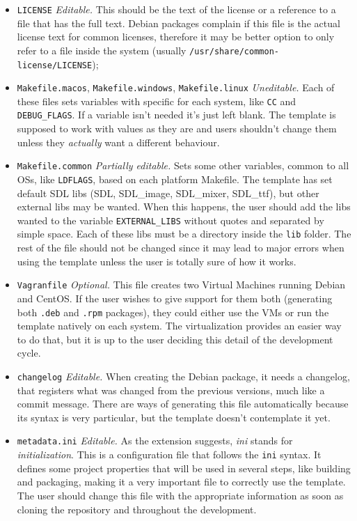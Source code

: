 \begin{itemize}
	\item \texttt{LICENSE} \emph{Editable.} This should be the text of the license or a reference to a file that has the full text. Debian packages complain if this file is the actual license text for common licenses, therefore it may be better option to only refer to a file inside the system (usually \texttt{/usr/share/common-license/LICENSE});
	\item \texttt{Makefile.macos}, \texttt{Makefile.windows}, \texttt{Makefile.linux} \emph{Uneditable.} Each of these files sets variables with specific for each system, like \texttt{CC} and \texttt{DEBUG\_FLAGS}. If a variable isn't needed it's just left blank. The template is supposed to work with values as they are and users shouldn't change them unless they \emph{actually} want a different behaviour.
	\item \texttt{Makefile.common} \emph{Partially editable.} Sets some other variables, common to all OSs, like \texttt{LDFLAGS}, based on each platform Makefile. The template has set default SDL libs (SDL, SDL\_image, SDL\_mixer, SDL\_ttf), but other external libs may be wanted. When this happens, the user should add the libs wanted to the variable \texttt{EXTERNAL\_LIBS} without quotes and separated by simple space. Each of these libs must be a directory inside the \texttt{lib} folder. The rest of the file should not be changed since it may lead to major errors when using the template unless the user is totally sure of how it works.
	\item \texttt{Vagranfile} \emph{Optional.} This file creates two Virtual Machines running Debian and CentOS. If the user wishes to give support for them both (generating both \texttt{.deb} and \texttt{.rpm} packages), they could either use the VMs or run the template natively on each system. The virtualization provides an easier way to do that, but it is up to the user deciding this detail of the development cycle.
	\item \texttt{changelog} \emph{Editable.} When creating the Debian package, it needs a changelog, that registers what was changed from the previous versions, much like a commit message. There are ways of generating this file automatically because its syntax is very particular, but the template doesn't contemplate it yet.
	\item \texttt{metadata.ini} \emph{Editable.} As the extension suggests, \textit{ini} stands for \textit{initialization}. This is a configuration file that follows the \texttt{ini} syntax. It defines some project properties that will be used in several steps, like building and packaging, making it a very important file to correctly use the template. The user should change this file with the appropriate information as soon as cloning the repository and throughout the development.
\end{itemize}

